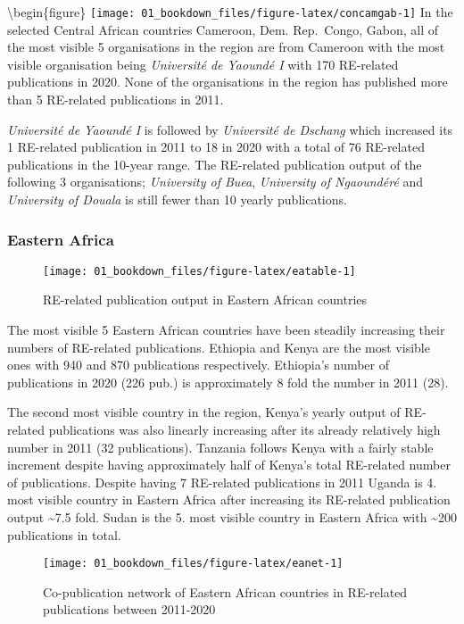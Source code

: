 \documentclass[12pt,twoside]{report}
\begin{document}
\textbackslash begin\{figure\}
\texttt{[image: 01\_bookdown\_files/figure-latex/concamgab-1]}
In the selected Central African countries Cameroon, Dem. Rep.~Congo, Gabon, all of the most visible 5 organisations in the region are from Cameroon with the most visible organisation being \emph{Université de Yaoundé I} with 170 RE-related publications in 2020. None of the organisations in the region has published more than 5 RE-related publications in 2011.

\emph{Université de Yaoundé I} is followed by \emph{Université de Dschang} which increased its 1 RE-related publication in 2011 to 18 in 2020 with a total of 76 RE-related publications in the 10-year range. The RE-related publication output of the following 3 organisations; \emph{University of Buea}, \emph{University of Ngaoundéré} and \emph{University of Douala} is still fewer than 10 yearly publications.

\hypertarget{eastern-africa}{%
\subsubsection{Eastern Africa}\label{eastern-africa}}

\begin{figure}
\texttt{[image: 01\_bookdown\_files/figure-latex/eatable-1]} \caption{RE-related publication output in Eastern African countries}\label{fig:eatable}
\end{figure}

The most visible 5 Eastern African countries have been steadily increasing their numbers of RE-related publications. Ethiopia and Kenya are the most visible ones with 940 and 870 publications respectively. Ethiopia's number of publications in 2020 (226 pub.) is approximately 8 fold the number in 2011 (28).

The second most visible country in the region, Kenya's yearly output of RE-related publications was also linearly increasing after its already relatively high number in 2011 (32 publications). Tanzania follows Kenya with a fairly stable increment despite having approximately half of Kenya's total RE-related number of publications. Despite having 7 RE-related publications in 2011 Uganda is 4. most visible country in Eastern Africa after increasing its RE-related publication output \textasciitilde7.5 fold. Sudan is the 5. most visible country in Eastern Africa with \textasciitilde200 publications in total.

\begin{figure}
\texttt{[image: 01\_bookdown\_files/figure-latex/eanet-1]} \caption{Co-publication network of Eastern African countries in RE-related publications between 2011-2020}\label{fig:eanet}
\end{figure}
\end{document}
